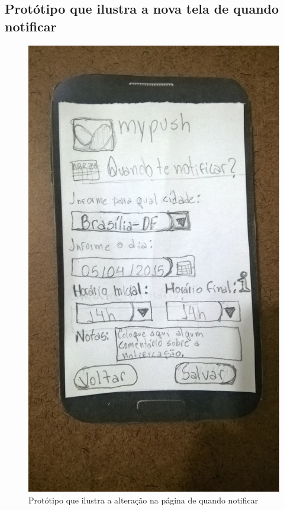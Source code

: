 \begin{anexosenv}
  \pagebreak
  \section*{Protótipo que ilustra a nova tela de quando notificar}

    \begin{figure}[!htbp]
      \centering
      \includegraphics[scale=0.32, angle=-90]{editaveis/figuras/prototipo_papel_v2/quando_notificar}
      \caption{Protótipo que ilustra a alteração na página de quando notificar}
      \label{quando_notificar_v2}
    \end{figure}
  

\end{anexosenv}
